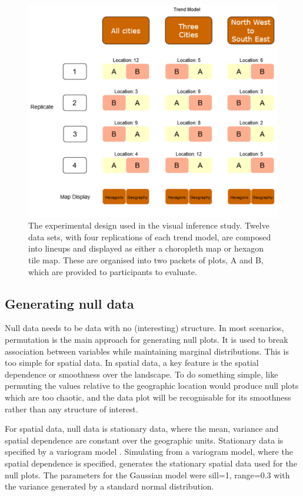 \documentclass[times, doublespace]{anzsauth}
\begin{document}
\begin{figure}
\includegraphics[width=1\linewidth]{paper_files/figure-latex/exp-design-1} \caption{The experimental design used in the visual inference study. Twelve data sets, with four replications of each trend model, are composed into lineups and displayed as either a choropleth map or hexagon tile map. These are organised into two packets of plots, A and B, which are provided to participants to evaluate.}\label{fig:exp-design}
\end{figure}

\subsection{Generating null data}\label{generating-null-data}

Null data needs to be data with no (interesting) structure. In most
scenarios, permutation is the main approach for generating null plots.
It is used to break association between variables while maintaining
marginal distributions. This is too simple for spatial data. In spatial
data, a key feature is the spatial dependence or smoothness over the
landscape. To do something simple, like permuting the values relative to
the geographic location would produce null plots which are too chaotic,
and the data plot will be recognisable for its smoothness rather than
any structure of interest.

For spatial data, null data is stationary data, where the mean, variance
and spatial dependence are constant over the geographic units.
Stationary data is specified by a variogram model
\citep{POG}. Simulating from a variogram model, where
the spatial dependence is specified, generates the stationary spatial
data used for the null plots. The parameters for the Gaussian model were
sill=1, range=0.3 with the variance generated by a standard normal
distribution.
\end{document}
